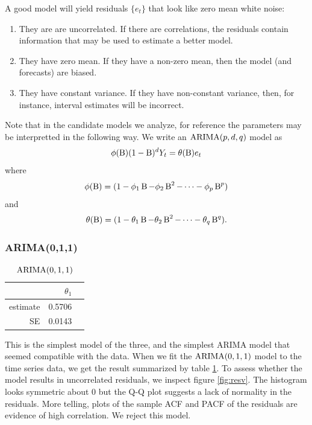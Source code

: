 \documentclass[final,
  11pt,
]{article}
\begin{document}
A good model will yield residuals \(\{e_t\}\) that look like zero mean
white noise:
\begin{enumerate}
\item They are are uncorrelated.
If there are correlations, the residuals contain information that may be used to
estimate a better model.
\item They have zero mean.
If they  have a non-zero mean, then the model (and forecasts) are biased.
\item They have constant variance. If they have non-constant variance,
then, for instance, interval estimates will be incorrect.
\end{enumerate}

Note that in the candidate models we analyze, for reference the parameters may be
interpretted in the following way.
We write an $\operatorname{ARIMA}(p, d, q)$ model as
$$
    \phi(\operatorname{B})(1-\operatorname{B})^d Y_t=\theta(\operatorname{B})e_t
$$
where
$$
    \phi(\operatorname{B}) = (1 - \phi_1 \operatorname{B} - \phi_2 \operatorname{B}^2 - \cdots - \phi_p \operatorname{B}^p)
$$
and
$$
    \theta(\operatorname{B}) = (1-\theta_1 \operatorname{B}-\theta_2 \operatorname{B}^2-\cdots-\theta_q \operatorname{B}^q).
$$

\hypertarget{ima11}{%
\subsubsection{ARIMA(0,1,1)}\label{ima11}}

\begin{table}
    \centering
    \caption{$\operatorname{ARIMA}(0,1,1)$}
    \begin{tabular}[t]{r r r}
        \hline
        &$\theta_1$\\
        \hline
        estimate &	 0.5706\\
        SE		 &	 0.0143\\
        \hline
    \end{tabular}
    \label{tbl:arima011}
\end{table}%

This is the simplest model of the three, and the simplest ARIMA model
that seemed compatible with the data. When we fit the \(\operatorname{ARIMA}(0,1,1)\)
model to the time series data, we get the result summarized by
table \ref{tbl:arima011}.
To assess whether the model results in uncorrelated residuals, we
inspect figure \ref{fig:resv}.
The histogram looks symmetric about \(0\) but the Q-Q plot suggests a lack of
normality in the residuals. More telling, plots of the sample ACF and
PACF of the residuals are evidence of high correlation. We reject this
model.
\end{document}
